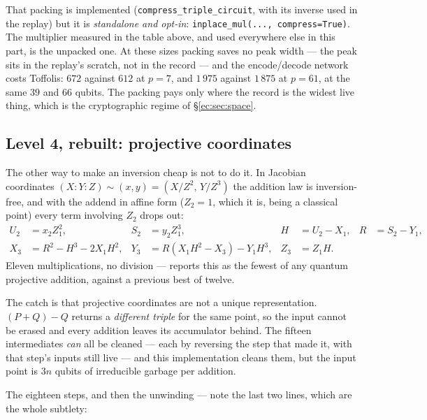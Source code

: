 \documentclass[11pt]{article}
\newcommand{\code}[1]{\texttt{#1}}
\theoremstyle{plain}
\theoremstyle{remark}
\begin{document}
That packing is implemented (\code{compress\_triple\_circuit}, with its inverse used in the replay)
but it is \emph{standalone and opt-in}: \code{inplace\_mul(..., compress=True)}. The multiplier
measured in the table above, and used everywhere else in this part, is the unpacked one. At these
sizes packing saves no peak width --- the peak sits in the replay's scratch, not in the record ---
and the encode/decode network costs Toffolis: $672$ against $612$ at $p=7$, and $1\,975$ against
$1\,875$ at $p=61$, at the same $39$ and $66$ qubits. The packing pays only where the record is
the widest live thing, which is the cryptographic regime of \S\ref{ec:sec:space}.

\subsection{Level 4, rebuilt: projective coordinates}\label{ec:sec:proj}

The other way to make an inversion cheap is not to do it. In Jacobian coordinates
$(X:Y:Z)\sim(x,y)=(X/Z^2,\,Y/Z^3)$ the addition law is inversion-free, and with the addend in
affine form ($Z_2=1$, which it is, being a classical point) every term involving $Z_2$ drops out:
\[
\begin{aligned}
U_2 &= x_2Z_1^2, & S_2 &= y_2Z_1^3, & H &= U_2-X_1, & R &= S_2-Y_1,\\
X_3 &= R^2-H^3-2X_1H^2, & Y_3 &= R(X_1H^2-X_3)-Y_1H^3, & Z_3 &= Z_1H. &&
\end{aligned}
\]
Eleven multiplications, no division --- \cite{ec:kim26} reports this as the fewest of any quantum
projective addition, against a previous best of twelve.

The catch is that projective coordinates are not a unique representation. $(P+Q)-Q$ returns a
\emph{different triple} for the same point, so the input cannot be erased and every addition leaves
its accumulator behind. The fifteen intermediates \emph{can} all be cleaned --- each by reversing
the step that made it, with that step's inputs still live --- and this implementation cleans them,
but the input point is $3n$ qubits of irreducible garbage per addition.

The eighteen steps, and then the unwinding --- note the last two lines, which are the whole
subtlety:
\end{document}
